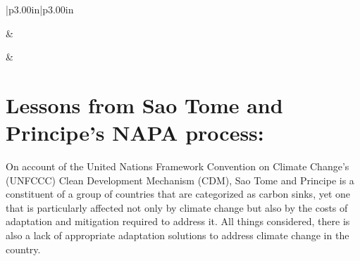 \documentclass[
]{book}
\begin{document}
\begin{longtable}[c]{|p{3.00in}|p{3.00in}}
\noalign{\global\setlength{\arrayrulewidth}{1pt}}



 &  \\

\noalign{\global\setlength{\arrayrulewidth}{1pt}}



 &  \\

\noalign{\global\setlength{\arrayrulewidth}{1pt}}



\end{longtable}

\hypertarget{lessons-from-sao-tome-and-principes-napa-process}{%
\section{Lessons from Sao Tome and Principe's NAPA process:}\label{lessons-from-sao-tome-and-principes-napa-process}}

On account of the United Nations Framework Convention on Climate Change's (UNFCCC) Clean Development Mechanism (CDM), Sao Tome and Principe is a constituent of a group of countries that are categorized as carbon sinks, yet one that is particularly affected not only by climate change but also by the costs of adaptation and mitigation required to address it. All things considered, there is also a lack of appropriate adaptation solutions to address climate change in the country.
\end{document}
